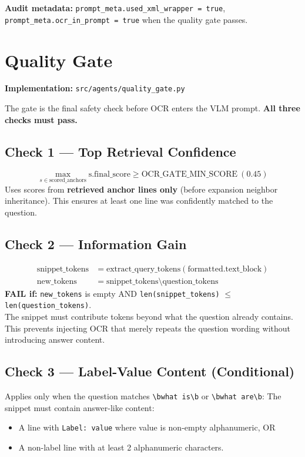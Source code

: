 \documentclass[11pt,a4paper]{article}
\begin{document}
\noindent\textbf{Audit metadata:} \texttt{prompt\_meta.used\_xml\_wrapper = true}, \texttt{prompt\_meta.ocr\_in\_prompt = true} when the quality gate passes.

\newpage
\section{Quality Gate}
\textbf{Implementation:} \texttt{src/agents/quality\_gate.py}

The gate is the final safety check before OCR enters the VLM prompt. \textbf{All three checks must pass.}

\subsection{Check 1 --- Top Retrieval Confidence}
\begin{equation}
\max_{s \in \text{scored\_anchors}} \text{s.final\_score} \ge \text{OCR\_GATE\_MIN\_SCORE} \ (0.45)
\end{equation}
Uses scores from \textbf{retrieved anchor lines only} (before expansion neighbor inheritance). This ensures at least one line was confidently matched to the question.

\subsection{Check 2 --- Information Gain}
\begin{align}
\text{snippet\_tokens} &= \text{extract\_query\_tokens}(\text{formatted.text\_block}) \\
\text{new\_tokens}     &= \text{snippet\_tokens} \setminus \text{question\_tokens}
\end{align}
\textbf{FAIL if:} \texttt{new\_tokens} is empty AND \texttt{len(snippet\_tokens)} $\le$ \texttt{len(question\_tokens)}. \\
The snippet must contribute tokens beyond what the question already contains. This prevents injecting OCR that merely repeats the question wording without introducing answer content.

\subsection{Check 3 --- Label-Value Content (Conditional)}
Applies only when the question matches \texttt{\textbackslash bwhat is\textbackslash b} or \texttt{\textbackslash bwhat are\textbackslash b}:
The snippet must contain answer-like content:
\begin{itemize}
    \item A line with \texttt{Label: value} where value is non-empty alphanumeric, OR
    \item A non-label line with at least 2 alphanumeric characters.
\end{itemize}
\end{document}
